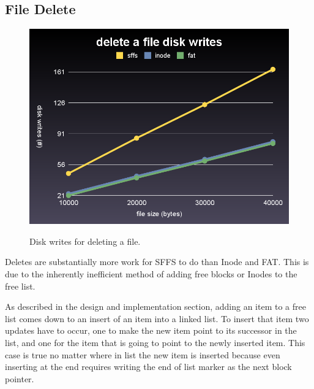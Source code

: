 \documentclass[10pt,twocolumn]{article}
\begin{document}
  \subsection{File Delete}
  \begin{figure}[h]
    \begin{center}
      \includegraphics[scale=0.2]{../graphs/delete_writes.png}
      \label{fig:delete_writes}
      \caption{Disk writes for deleting a file.}
    \end{center}
  \end{figure}

  Deletes are substantially more work for SFFS to do than Inode and FAT. This
  is due to the inherently inefficient method of adding free blocks or Inodes
  to the free list.

  As described in the design and implementation section, adding an item to
  a free list comes down to an insert of an item into a linked list. To
  insert that item two updates have to occur, one to make the new item point to
  its successor in the list, and one for the item that is going to point to the 
  newly inserted item. This case is true no matter where in list the new item
  is inserted because even inserting at the end requires writing the end of 
  list marker as the next block pointer.
\end{document}
